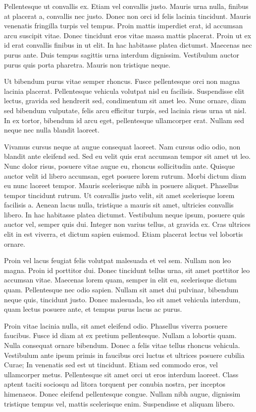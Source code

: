 Pellentesque ut convallis ex. Etiam vel convallis justo. Mauris urna nulla, finibus at placerat a, convallis nec justo. Donec non orci id felis lacinia tincidunt. Mauris venenatis fringilla turpis vel tempus. Proin mattis imperdiet erat, id accumsan arcu suscipit vitae. Donec tincidunt eros vitae massa mattis placerat. Proin ut ex id erat convallis finibus in ut elit. In hac habitasse platea dictumst. Maecenas nec purus ante. Duis tempus sagittis urna interdum dignissim. Vestibulum auctor purus quis porta pharetra. Mauris non tristique neque.

Ut bibendum purus vitae semper rhoncus. Fusce pellentesque orci non magna lacinia placerat. Pellentesque vehicula volutpat nisl eu facilisis. Suspendisse elit lectus, gravida sed hendrerit sed, condimentum sit amet leo. Nunc ornare, diam sed bibendum vulputate, felis arcu efficitur turpis, sed lacinia risus urna ut nisl. In ex tortor, bibendum id arcu eget, pellentesque ullamcorper erat. Nullam sed neque nec nulla blandit laoreet.

Vivamus cursus neque at augue consequat laoreet. Nam cursus odio odio, non blandit ante eleifend sed. Sed eu velit quis erat accumsan tempor sit amet ut leo. Nunc dolor risus, posuere vitae augue eu, rhoncus sollicitudin ante. Quisque auctor velit id libero accumsan, eget posuere lorem rutrum. Morbi dictum diam eu nunc laoreet tempor. Mauris scelerisque nibh in posuere aliquet. Phasellus tempor tincidunt rutrum. Ut convallis justo velit, sit amet scelerisque lorem facilisis a. Aenean lacus nulla, tristique a mauris sit amet, ultricies convallis libero. In hac habitasse platea dictumst. Vestibulum neque ipsum, posuere quis auctor vel, semper quis dui. Integer non varius tellus, at gravida ex. Cras ultrices elit in est viverra, et dictum sapien euismod. Etiam placerat lectus vel lobortis ornare.

Proin vel lacus feugiat felis volutpat malesuada et vel sem. Nullam non leo magna. Proin id porttitor dui. Donec tincidunt tellus urna, sit amet porttitor leo accumsan vitae. Maecenas lorem quam, semper in elit eu, scelerisque dictum quam. Pellentesque nec odio sapien. Nullam sit amet dui pulvinar, bibendum neque quis, tincidunt justo. Donec malesuada, leo sit amet vehicula interdum, quam lectus posuere ante, et tempus purus lacus ac purus.

Proin vitae lacinia nulla, sit amet eleifend odio. Phasellus viverra posuere faucibus. Fusce id diam at ex pretium pellentesque. Nullam a lobortis quam. Nulla consequat ornare bibendum. Donec a felis vitae tellus rhoncus vehicula. Vestibulum ante ipsum primis in faucibus orci luctus et ultrices posuere cubilia Curae; In venenatis sed est ut tincidunt. Etiam sed commodo eros, vel ullamcorper metus. Pellentesque sit amet orci ut eros interdum laoreet. Class aptent taciti sociosqu ad litora torquent per conubia nostra, per inceptos himenaeos. Donec eleifend pellentesque congue. Nullam nibh augue, dignissim tristique tempus vel, mattis scelerisque enim. Suspendisse et aliquam libero.

